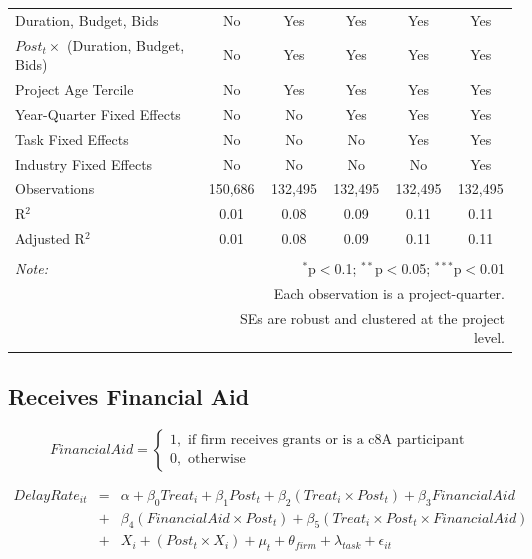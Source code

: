 \documentclass[
]{article}
\begin{document}
\begin{table}[H]
\begin{tabular}{@{\extracolsep{-2pt}}lccccc}
Duration, Budget, Bids & No & Yes & Yes & Yes & Yes \\ 
$Post_t \times $  (Duration, Budget, Bids) & No & Yes & Yes & Yes & Yes \\ 
Project Age Tercile & No & Yes & Yes & Yes & Yes \\ 
Year-Quarter Fixed Effects & No & No & Yes & Yes & Yes \\ 
Task Fixed Effects & No & No & No & Yes & Yes \\ 
Industry Fixed Effects & No & No & No & No & Yes \\ 
Observations & 150,686 & 132,495 & 132,495 & 132,495 & 132,495 \\ 
R$^{2}$ & 0.01 & 0.08 & 0.09 & 0.11 & 0.11 \\ 
Adjusted R$^{2}$ & 0.01 & 0.08 & 0.09 & 0.11 & 0.11 \\ 
\hline 
\hline \\[-1.8ex] 
\textit{Note:}  & \multicolumn{5}{r}{$^{*}$p$<$0.1; $^{**}$p$<$0.05; $^{***}$p$<$0.01} \\ 
 & \multicolumn{5}{r}{Each observation is a project-quarter.} \\ 
 & \multicolumn{5}{r}{SEs are robust and clustered at the project level.} \\ 
\end{tabular} 
\end{table}

\hypertarget{receives-financial-aid}{%
\subsection{Receives Financial Aid}\label{receives-financial-aid}}

\[ FinancialAid = \begin{cases} 1, \text{ if firm receives grants or is a c8A participant}\\
0, \text{ otherwise} \end{cases}\]

\[ \begin{aligned}
DelayRate_{it} &=& \alpha+\beta_0 Treat_i + \beta_1 Post_t + \beta_2 (Treat_i \times Post_t) +\beta_3 FinancialAid \\
&+& \beta_4 (FinancialAid \times Post_t) + \beta_5 (Treat_i \times Post_t \times FinancialAid) \\ 
&+&X_i + (Post_t \times X_i) + \mu_t + \theta_{firm} + \lambda_{task}+ \epsilon_{it}
\end{aligned}\]
\end{document}
